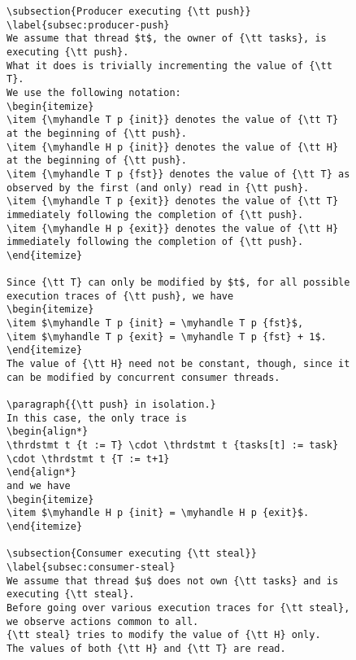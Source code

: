 \documentclass[a4paper]{article}
\begin{document}
{\begin{figure}
\begin{lstlisting}
\subsection{Producer executing {\tt push}}
\label{subsec:producer-push}
We assume that thread $t$, the owner of {\tt tasks}, is executing {\tt push}.
What it does is trivially incrementing the value of {\tt T}. 
We use the following notation:
\begin{itemize}
\item {\myhandle T p {init}} denotes the value of {\tt T} at the beginning of {\tt push}.
\item {\myhandle H p {init}} denotes the value of {\tt H} at the beginning of {\tt push}.
\item {\myhandle T p {fst}} denotes the value of {\tt T} as observed by the first (and only) read in {\tt push}.
\item {\myhandle T p {exit}} denotes the value of {\tt T} immediately following the completion of {\tt push}.
\item {\myhandle H p {exit}} denotes the value of {\tt H} immediately following the completion of {\tt push}.
\end{itemize}

Since {\tt T} can only be modified by $t$, for all possible execution traces of {\tt push}, we have
\begin{itemize}
\item $\myhandle T p {init} = \myhandle T p {fst}$,
\item $\myhandle T p {exit} = \myhandle T p {fst} + 1$.
\end{itemize}
The value of {\tt H} need not be constant, though, since it can be modified by concurrent consumer threads.

\paragraph{{\tt push} in isolation.}
In this case, the only trace is 
\begin{align*}
\thrdstmt t {t := T} \cdot \thrdstmt t {tasks[t] := task} \cdot \thrdstmt t {T := t+1}
\end{align*}
and we have
\begin{itemize}
\item $\myhandle H p {init} = \myhandle H p {exit}$.
\end{itemize}

\subsection{Consumer executing {\tt steal}}
\label{subsec:consumer-steal}
We assume that thread $u$ does not own {\tt tasks} and is executing {\tt steal}.
Before going over various execution traces for {\tt steal}, we observe actions common to all.
{\tt steal} tries to modify the value of {\tt H} only. 
The values of both {\tt H} and {\tt T} are read.


\end{lstlisting}
\end{figure}}
\end{document}
